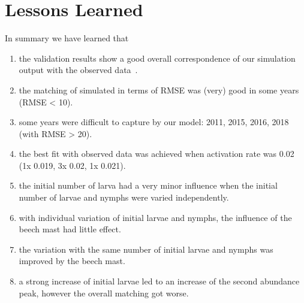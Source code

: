 \documentclass[a4paper, 11pt]{scrartcl}
\begin{document}
\section{Lessons Learned}


In summary we have learned that

\begin{enumerate}
\item the validation results show a good overall correspondence of our simulation output with the observed data~\parencite{Brugger.2017}.
\item the matching of simulated in terms of RMSE was (very) good in some years (RMSE < 10).
\item some years were difficult to capture by our model: 2011, 2015, 2016, 2018 (with RMSE > 20).
\item the best fit with observed data was achieved when activation rate was 0.02 (1x 0.019,  3x 0.02,  1x 0.021).
\item the initial number of larva had a very minor influence when the initial number of larvae and nymphs were varied independently.
\item with individual variation of initial larvae and nymphs, the influence of the beech mast had little effect.
\item the variation with the same number of initial larvae and nymphs was improved by the beech mast.
\item a strong increase of initial larvae led to an increase of the second abundance peak, however the overall matching got worse.
\end{enumerate}


\printbibliography[heading = bibintoc, title = {Bibliography}]
\end{document}

